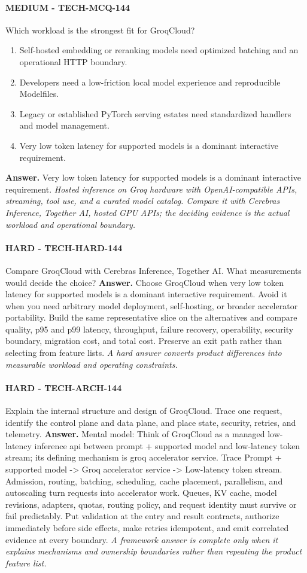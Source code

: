 \paragraph{MEDIUM - TECH-MCQ-144} Which workload is the strongest fit for GroqCloud?
\begin{enumerate}[label=\Alph*.]
\item Self-hosted embedding or reranking models need optimized batching and an operational HTTP boundary.
\item Developers need a low-friction local model experience and reproducible Modelfiles.
\item Legacy or established PyTorch serving estates need standardized handlers and model management.
\item Very low token latency for supported models is a dominant interactive requirement.
\end{enumerate}
\textbf{Answer.} Very low token latency for supported models is a dominant interactive requirement.
\textit{Hosted inference on Groq hardware with OpenAI-compatible APIs, streaming, tool use, and a curated model catalog. Compare it with Cerebras Inference, Together AI, hosted GPU APIs; the deciding evidence is the actual workload and operational boundary.}
\paragraph{HARD - TECH-HARD-144} Compare GroqCloud with Cerebras Inference, Together AI. What measurements would decide the choice?
\textbf{Answer.} Choose GroqCloud when very low token latency for supported models is a dominant interactive requirement. Avoid it when you need arbitrary model deployment, self-hosting, or broader accelerator portability. Build the same representative slice on the alternatives and compare quality, p95 and p99 latency, throughput, failure recovery, operability, security boundary, migration cost, and total cost. Preserve an exit path rather than selecting from feature lists.
\textit{A hard answer converts product differences into measurable workload and operating constraints.}
\paragraph{HARD - TECH-ARCH-144} Explain the internal structure and design of GroqCloud. Trace one request, identify the control plane and data plane, and place state, security, retries, and telemetry.
\textbf{Answer.} Mental model: Think of GroqCloud as a managed low-latency inference api between prompt + supported model and low-latency token stream; its defining mechanism is groq accelerator service. Trace Prompt + supported model -> Groq accelerator service -> Low-latency token stream. Admission, routing, batching, scheduling, cache placement, parallelism, and autoscaling turn requests into accelerator work. Queues, KV cache, model revisions, adapters, quotas, routing policy, and request identity must survive or fail predictably. Put validation at the entry and result contracts, authorize immediately before side effects, make retries idempotent, and emit correlated evidence at every boundary.
\textit{A framework answer is complete only when it explains mechanisms and ownership boundaries rather than repeating the product feature list.}
